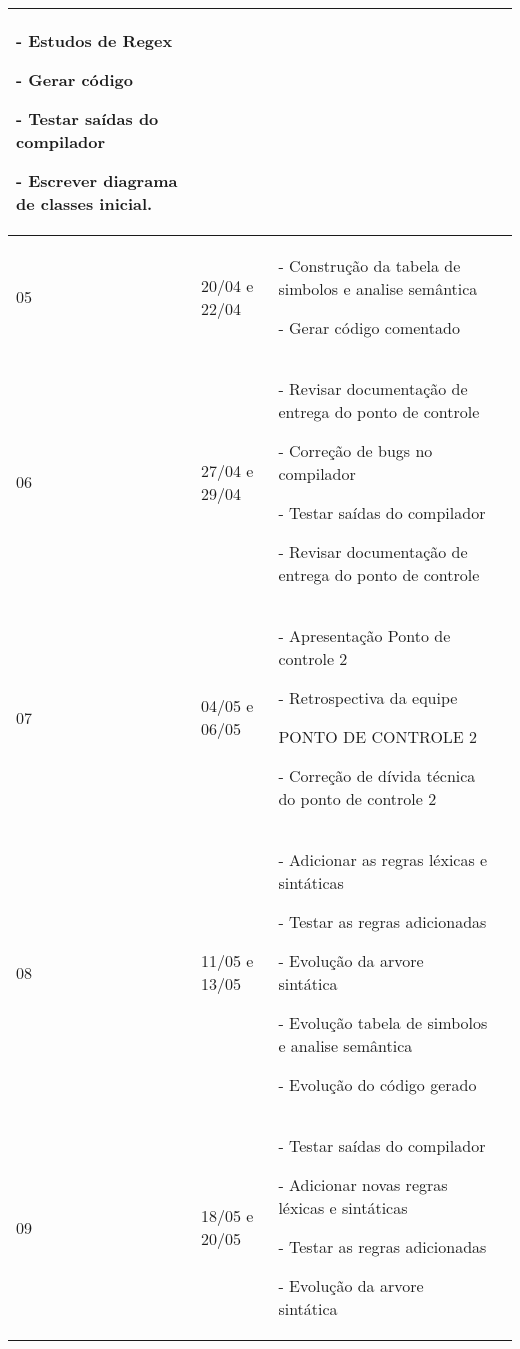 \begin{table}[htb]
\begin{tabular}{|p{1.4cm}|p{3cm}|p{8cm}|p{8cm}|}
   \par - Estudos de Regex 
   \par - Gerar código 
   \par - Testar saídas do compilador 
   \par - Escrever diagrama de classes inicial. \\
   \hline
    05 & 20/04 e 22/04 &
   \par - Construção da tabela de simbolos e analise semântica 
   \par - Gerar código comentado \\
   \hline
	06 & 27/04 e 29/04 &
   \par - Revisar documentação de entrega do ponto de controle 
   \par - Correção de bugs no compilador 
   \par - Testar saídas do compilador 
   \par - Revisar documentação de entrega do ponto de controle \\
   \hline
    07 & 04/05 e 06/05 &
   \par - Apresentação Ponto de controle 2 
   \par - Retrospectiva da equipe 
   \par PONTO DE CONTROLE 2 
   \par -  Correção de dívida técnica do ponto de controle 2 \\
   \hline
	08 & 11/05 e 13/05 &
   \par - Adicionar as regras léxicas e sintáticas 
   \par - Testar as regras adicionadas 
   \par - Evolução da arvore sintática 
   \par - Evolução tabela de simbolos e analise semântica 
   \par - Evolução do código gerado \\
   \hline
	09 & 18/05 e 20/05 &
   \par - Testar saídas do compilador 
   \par - Adicionar novas regras léxicas e sintáticas 
   \par - Testar as regras adicionadas 
   \par - Evolução da arvore sintática \\
   \hline
\end{tabular}
\end{table}

